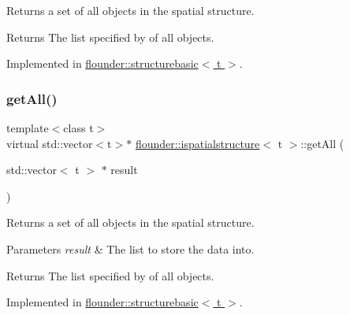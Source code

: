 Returns a set of all objects in the spatial structure. 

\begin{DoxyReturn}{Returns}
The list specified by of all objects. 
\end{DoxyReturn}


Implemented in \hyperlink{classflounder_1_1structurebasic_a77aa32807b5d3b901a6184cf6af81073}{flounder\+::structurebasic$<$ t $>$}.

\mbox{\label{classflounder_1_1ispatialstructure_adf21d28c4c648b0b97763c23f2051484}} 
\subsubsection{\texorpdfstring{get\+All()}{getAll()}\hspace{0.1cm}{\footnotesize\ttfamily [2/2]}}
{\footnotesize\ttfamily template$<$class t$>$ \\
virtual std\+::vector$<$t$>$$\ast$ \hyperlink{classflounder_1_1ispatialstructure}{flounder\+::ispatialstructure}$<$ t $>$\+::get\+All (\begin{DoxyParamCaption}\item[{std\+::vector$<$ t $>$ $\ast$}]{result }\end{DoxyParamCaption})\hspace{0.3cm}{\ttfamily [pure virtual]}}



Returns a set of all objects in the spatial structure. 


\begin{DoxyParams}{Parameters}
{\em result} & The list to store the data into. \\
\hline
\end{DoxyParams}
\begin{DoxyReturn}{Returns}
The list specified by of all objects. 
\end{DoxyReturn}


Implemented in \hyperlink{classflounder_1_1structurebasic_a269fcc272481b2182123523f75afb3f5}{flounder\+::structurebasic$<$ t $>$}.

\mbox{\label{classflounder_1_1ispatialstructure_a9daf7778a9bde304e08070eaeffb8fbd}} 
